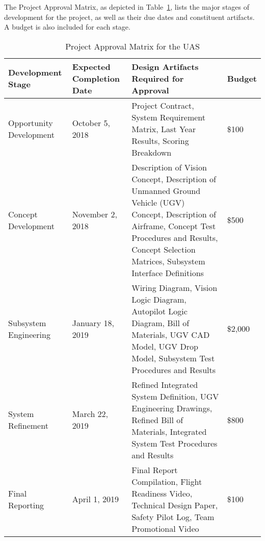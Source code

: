 

The Project Approval Matrix, as depicted in Table~\ref{tab:proj_app}, lists the major stages of development for the project, as well as their due dates and constituent artifacts. A budget is also included for each stage. 

\begin{table}[h!]
\caption{Project Approval Matrix for the UAS}\label{tab:proj_app}
\begin{tabular}{|p{4cm}|p{3.5cm}|p{5.4cm}|p{1.5cm}|}
 \hline	
\rowcolor[HTML]{C0C0C0}	
{\color[HTML]{000000} \textbf{Development Stage}} & {\color[HTML]{000000} \textbf{Expected Completion Date}} & {\color[HTML]{000000} \textbf{Design Artifacts Required for Approval}} & {\color[HTML]{000000} \textbf{Budget}}\\ \hline	
Opportunity Development & October 5, 2018 & Project Contract, System Requirement Matrix, Last Year Results, Scoring Breakdown & \$100 \\ \hline	
Concept Development & November 2, 2018 & Description of Vision Concept, Description of Unmanned Ground Vehicle (UGV) Concept, Description of Airframe, Concept Test Procedures and Results, Concept Selection Matrices, Subsystem Interface Definitions & \$500 \\ \hline	
Subsystem Engineering & January 18, 2019 & Wiring Diagram, Vision Logic Diagram, Autopilot Logic Diagram, Bill of Materials, UGV CAD Model, UGV Drop Model, Subsystem Test Procedures and Results & \$2,000\\ \hline	
System Refinement & March 22, 2019 & Refined Integrated System Definition, UGV Engineering Drawings, Refined Bill of Materials, Integrated System Test Procedures and Results & \$800\\ \hline	
Final Reporting & April 1, 2019 & Final Report Compilation, Flight Readiness Video, Technical Design Paper, Safety Pilot Log, Team Promotional Video & \$100 \\ \hline	

  \hline  
\end{tabular}

\end{table}
